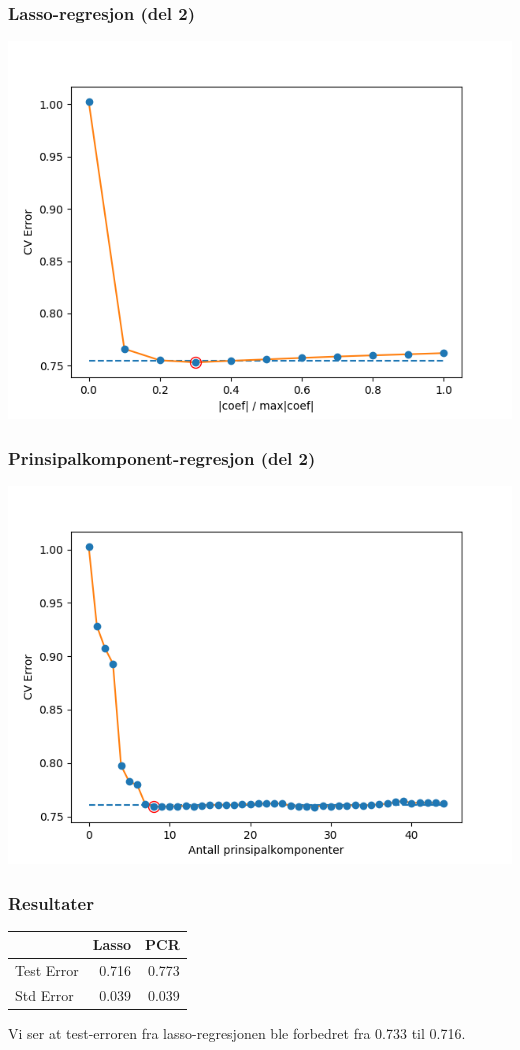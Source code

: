 \documentclass[aspectratio=169]{beamer}
\begin{document}
\begin{frame}
  \frametitle{Lasso-regresjon (del 2)}
  \begin{center}
    \includegraphics[height=0.8\textheight]{lasso_CV2.png}
  \end{center}
\end{frame}

\begin{frame}
    \frametitle{Prinsipalkomponent-regresjon (del 2)}
  \begin{center}
    \includegraphics[height=0.8\textheight]{pcr_CV2.png}
  \end{center}
\end{frame}

\begin{frame}
  \frametitle{Resultater}
\begin{center}
  \begin{tabular}{ l r r}
     & Lasso & PCR \\
    \hline
    Test Error & 0.716 & 0.773 \\
    Std Error & 0.039 & 0.039
  \end{tabular}
  \end{center}
  Vi ser at test-erroren fra lasso-regresjonen ble forbedret fra 0.733 til 0.716.
\end{frame}
\end{document}

